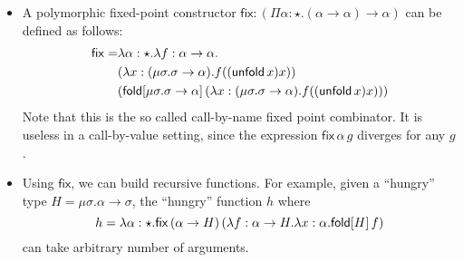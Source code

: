 \begin{itemize}
  \newcommand{\FPTypeU}{\mu\sigma . \sigma \to \alpha}
  \newcommand{\FPTermfxx}{\lambda
    x:(\FPTypeU).f((\unfold{x})x)}
  \newcommand{\FP}{\mathsf{fix}} %
\item A polymorphic fixed-point constructor
  $\FP:(\Pi \alpha:\star.(\alpha \to \alpha) \to \alpha)$ can be
  defined as follows:
\begin{align*}
  \FP=&\lambda \alpha:\star . \lambda f:\alpha \to \alpha.\\
      &(\FPTermfxx)\\
      &(\fold{\FPTypeU}{(\FPTermfxx)})
\end{align*}
Note that this is the so called call-by-name fixed point
combinator. It is useless in a call-by-value setting, since the
expression $\FP\,\alpha\,g$ diverges for any $g$.
\newcommand{\HGType}{\mu\sigma. \alpha \to \sigma}%
\item Using $\FP$, we can build recursive functions. For example,
  given a ``hungry'' type $H=\HGType$, the ``hungry'' function $h$
  where
  \[h=\lambda \alpha:\star.\FP\,(\alpha \to H)\,(\lambda f:\alpha \to
  H.\lambda x:\alpha.\fold{H}{f})\]
  can take arbitrary number of arguments.
\end{itemize}
